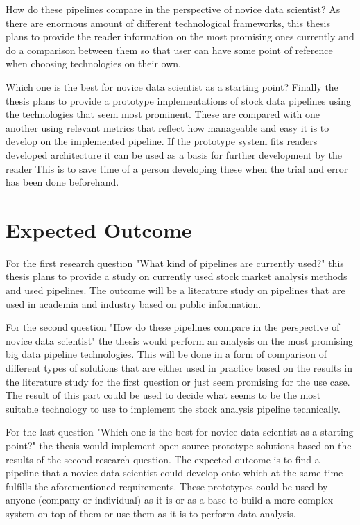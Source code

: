 How do these pipelines compare in the perspective of novice data scientist?
As there are enormous amount of different technological frameworks, this thesis plans to provide the reader information on the most promising ones currently and do a comparison between them so that user can have some point of reference when choosing technologies on their own.

Which one is the best for novice data scientist as a starting point?
Finally the thesis plans to provide a prototype implementations of stock data pipelines using the technologies that seem most prominent.
These are compared with one another using relevant metrics that reflect how manageable and easy it is to develop on the implemented pipeline.
If the prototype system fits readers developed architecture it can be used as a basis for further development by the reader
This is to save time of a person developing these when the trial and error has been done beforehand.

\section{Expected Outcome}

For the first research question "What kind of pipelines are currently used?" this thesis plans to provide a study on currently used stock market analysis methods and used pipelines.
The outcome will be a literature study on pipelines that are used in academia and industry based on public information.

For the second question "How do these pipelines compare in the perspective of novice data scientist" the thesis would perform an analysis on the most promising big data pipeline technologies.
This will be done in a form of comparison of different types of solutions that are either used in practice based on the results in the literature study for the first question or just seem promising for the use case.
The result of this part could be used to decide what seems to be the most suitable technology to use to implement the stock analysis pipeline technically.

For the last question "Which one is the best for novice data scientist as a starting point?" the thesis would implement open-source prototype solutions based on the results of the second research question.
The expected outcome is to find a pipeline that a novice data scientist could develop onto which at the same time fulfills the aforementioned requirements.
These prototypes could be used by anyone (company or individual) as it is or as a base to build a more complex system on top of them or use them as it is to perform data analysis.

